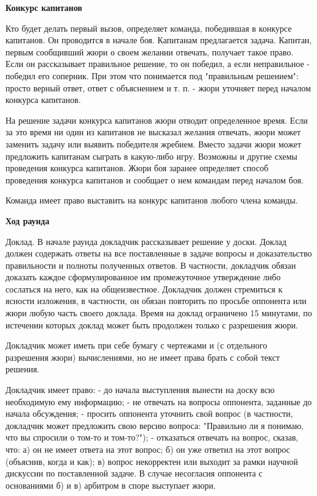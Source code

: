 \documentclass{article}
\begin{document}
\begin{center}
\textbf{Конкурс капитанов}
\end{center}

Кто будет делать первый вызов, определяет команда, победившая в конкурсе капитанов. Он проводится в начале боя. Капитанам предлагается задача. Капитан, первым сообщивший жюри о своем желании отвечать, получает такое право. Если он рассказывает правильное решение, то он победил, а если неправильное - победил его соперник. При этом что понимается под "правильным решением": просто верный ответ, ответ с объяснением и т. п. - жюри уточняет перед началом конкурса капитанов.

На решение задачи конкурса капитанов жюри отводит определенное время. Если за это время ни один из капитанов не высказал желания отвечать, жюри может заменить задачу или выявить победителя жребием. Вместо задачи жюри может предложить капитанам сыграть в какую-либо игру. Возможны и другие схемы проведения конкурса капитанов. Жюри боя заранее определяет способ проведения конкурса капитанов и сообщает о нем командам перед началом боя.

Команда имеет право выставить на конкурс капитанов любого члена команды.
\newpage
\begin{center}
\textbf{Ход раунда}
\end{center}

Доклад. В начале раунда докладчик рассказывает решение у доски. Доклад должен содержать ответы на все поставленные в задаче вопросы и доказательство правильности и полноты полученных ответов. В частности, докладчик обязан доказать каждое сформулированное им промежуточное утверждение либо сослаться на него, как на общеизвестное. Докладчик должен стремиться к ясности изложения, в частности, он обязан повторить по просьбе оппонента или жюри любую часть своего доклада. Время на доклад ограничено 15 минутами, по истечении которых доклад может быть продолжен только с разрешения жюри.

Докладчик может иметь при себе бумагу с чертежами и (с отдельного разрешения жюри) вычислениями, но не имеет права брать с собой текст решения.

Докладчик имеет право: 
- до начала выступления вынести на доску всю необходимую ему информацию; 
- не отвечать на вопросы оппонента, заданные до начала обсуждения; 
- просить оппонента уточнить свой вопрос (в частности, докладчик может предложить свою версию вопроса: "Правильно ли я понимаю, что вы спросили о том-то и том-то?"); 
- отказаться отвечать на вопрос, сказав, что: а) он не имеет ответа на этот вопрос; б) он уже ответил на этот вопрос (объяснив, когда и как); в) вопрос некорректен или выходит за рамки научной дискуссии по поставленной задаче. В случае несогласия оппонента с основаниями б) и в) арбитром в споре выступает жюри.
\end{document}

